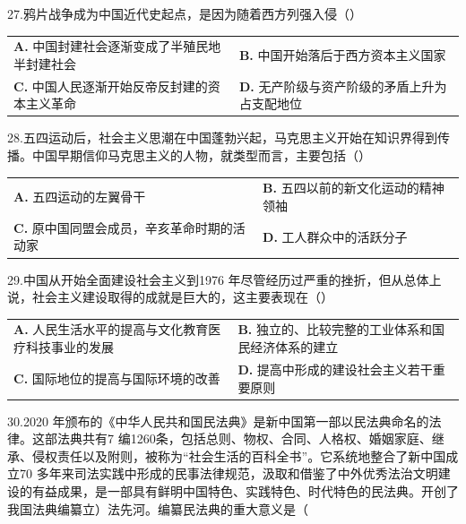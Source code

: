 \documentclass[UTF8,11pt]{ctexart}
\begin{document}
27.鸦片战争成为中国近代史起点，是因为随着西方列强入侵（）


\begin{center}\begin{tabular}{>{\raggedright\arraybackslash}p{\dimexpr(\linewidth-4\tabcolsep)/2\relax}>{\raggedright\arraybackslash}p{\dimexpr(\linewidth-4\tabcolsep)/2\relax}}
\textbf{A.} 中国封建社会逐渐变成了半殖民地半封建社会 & \textbf{B.} 中国开始落后于西方资本主义国家\\[.35em]
\textbf{C.} 中国人民逐渐开始反帝反封建的资本主义革命 & \textbf{D.} 无产阶级与资产阶级的矛盾上升为占支配地位\\[.35em]\end{tabular}\end{center}

28.五四运动后，社会主义思潮在中国蓬勃兴起，马克思主义开始在知识界得到传播。中国早期信仰马克思主义的人物，就类型而言，主要包括（）


\begin{center}\begin{tabular}{>{\raggedright\arraybackslash}p{\dimexpr(\linewidth-4\tabcolsep)/2\relax}>{\raggedright\arraybackslash}p{\dimexpr(\linewidth-4\tabcolsep)/2\relax}}
\textbf{A.} 五四运动的左翼骨干 & \textbf{B.} 五四以前的新文化运动的精神领袖\\[.35em]
\textbf{C.} 原中国同盟会成员，辛亥革命时期的活动家 & \textbf{D.} 工人群众中的活跃分子\\[.35em]\end{tabular}\end{center}

29.中国从开始全面建设社会主义到1976 年尽管经历过严重的挫折，但从总体上说，社会主义建设取得的成就是巨大的，这主要表现在（）


\begin{center}\begin{tabular}{>{\raggedright\arraybackslash}p{\dimexpr(\linewidth-4\tabcolsep)/2\relax}>{\raggedright\arraybackslash}p{\dimexpr(\linewidth-4\tabcolsep)/2\relax}}
\textbf{A.} 人民生活水平的提高与文化教育医疗科技事业的发展 & \textbf{B.} 独立的、比较完整的工业体系和国民经济体系的建立\\[.35em]
\textbf{C.} 国际地位的提高与国际环境的改善 & \textbf{D.} 提高中形成的建设社会主义若干重要原则\\[.35em]\end{tabular}\end{center}

30.2020 年颁布的《中华人民共和国民法典》是新中国第一部以民法典命名的法律。这部法典共有7 编1260条，包括总则、物权、合同、人格权、婚姻家庭、继承、侵权责任以及附则，被称为“社会生活的百科全书”。它系统地整合了新中国成立70 多年来司法实践中形成的民事法律规范，汲取和借鉴了中外优秀法治文明建设的有益成果，是一部具有鲜明中国特色、实践特色、时代特色的民法典。开创了我国法典编纂立）法先河。编纂民法典的重大意义是（
\end{document}
